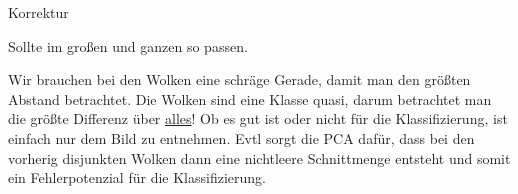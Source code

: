 \begin{topic}
	Korrektur
\end{topic}

\begin{aufgabe}
\end{aufgabe}
Sollte im großen und ganzen so passen.

\begin{aufgabe}
\end{aufgabe}
Wir brauchen bei den Wolken eine schräge Gerade, damit man den größten Abstand betrachtet. Die Wolken sind eine Klasse quasi, darum betrachtet man die größte Differenz über \underline{alles}! Ob es gut ist oder nicht für die Klassifizierung, ist einfach nur dem Bild zu entnehmen. Evtl sorgt die PCA dafür, dass bei den vorherig disjunkten Wolken dann eine nichtleere Schnittmenge entsteht und somit ein Fehlerpotenzial für die Klassifizierung. 